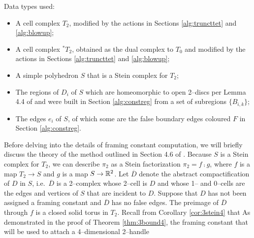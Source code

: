 \label{alg:framingnumbers}

Data types used:
\begin{itemize}
	\item A cell complex $T_2$, modified by the actions in Sections \ref{alg:truncttet} and \ref{alg:blowup};
	\item A cell complex ${}^\ast\!T_2$, obtained as the dual complex to $T_0$ and modified by the actions in Sections \ref{alg:truncttet} and \ref{alg:blowup};
	\item A simple polyhedron $S$ that is a Stein complex for $T_2$;
	\item The regions of $D_i$ of $S$ which are homeomorphic to open 2--discs per Lemma 4.4 of \cite{CostThur08} and were built in Section \ref{alg:constreg} from a set of subregions $\{B_{i,k}\}$;
	\item The edges $e_i$ of $S$, of which some are the false boundary edges coloured $F$ in Section \ref{alg:constreg}.
\end{itemize}

Before delving into the details of framing constant computation, we will briefly discuss the theory of the method outlined in Section 4.6 of \cite{CostThur08}.
Because $S$ is a Stein complex for $T_2$, we can describe $\pi_2$ as a Stein factorization $\pi_2=f\comp g$, where $f$ is a map $T_2\to S$ and $g$ is a map $S\to \mathbb{R}^2$.
Let $\overline{D}$ denote the abstract compactification of $D$ in $S$, i.e.\ $\overline{D}$ is a 2--complex whose 2--cell is $D$ and whose 1-- and 0--cells are the edges and vertices of $S$ that are incident to $D$.
Suppose that $D$ has not been assigned a framing constant and $\overline{D}$ has no false edges.
The preimage of $\overline{D}$ through $f$ is a closed solid torus in $T_2$.
Recall from Corollary \ref{cor:3stein4} that 
As demonstrated in the proof of Theorem \ref{thm:3bound4}, the framing constant that will be used to attach a 4--dimensional 2--handle 

